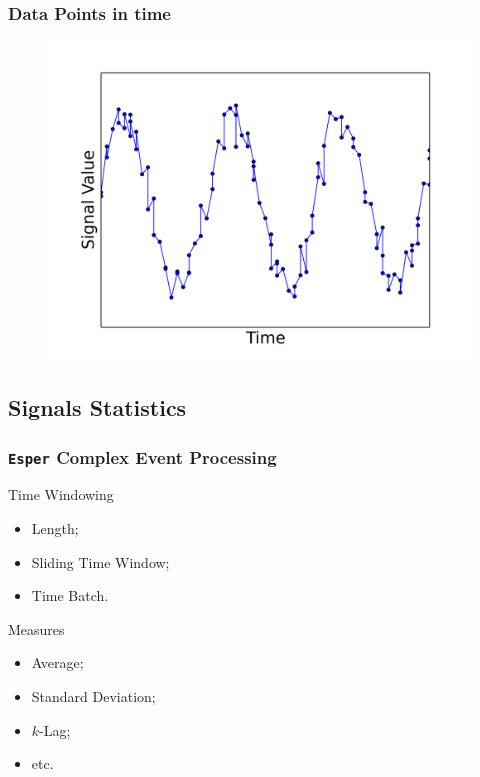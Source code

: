 \documentclass{beamer}
\begin{document}
  \begin{frame}[foot]
    \frametitle{Data Points in time}
    \begin{figure}
      \includegraphics[scale=.5]{./gfx/feature5.png}
    \end{figure}
  \end{frame}

  \subsection{Signals Statistics}
  \begin{frame}[foot]
    \frametitle{\texttt{Esper} Complex Event Processing}
    \begin{block}{Time Windowing}
      \begin{itemize}
        \item Length;
        \item Sliding Time Window;
        \item Time Batch.
      \end{itemize}
    \end{block}
    \begin{block}{Measures}
      \begin{itemize}
        \item Average;
        \item Standard Deviation;
        \item $k$-Lag;
        \item etc.\
      \end{itemize}
    \end{block}
  \end{frame}
\end{document}
